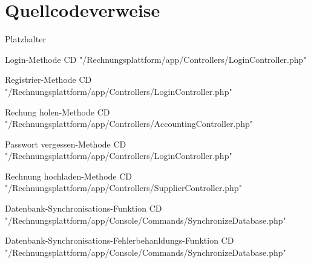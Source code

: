 %
%


\nocite{*} %





\listoffigures



\listoftables

\renewcommand\lstlistlistingname{Quellcodeverzeichnis} 
\lstlistoflistings 

\chapter{Quellcodeverweise}
\begin{bfscript}{Platzhalter}

\item [Login-Methode\label{logincode}] CD "/Rechnungsplattform/app/Controllers/LoginController.php"

\item [Registrier-Methode \label{regiscode}] CD "/Rechnungsplattform/app/Controllers/LoginController.php"

\item [Rechung holen-Methode \label{holencode}] CD "/Rechnungsplattform/app/Controllers/AccountingController.php"

\item [Passwort vergessen-Methode \label{vergessencode}] CD "/Rechnungsplattform/app/Controllers/LoginController.php"

\item [Rechnung hochladen-Methode \label{hochladencode}] CD "/Rechnungsplattform/app/Controllers/SupplierController.php"

\item [Datenbank-Synchronisations-Funktion \label{datenbanksynchronisationcode}] CD "/Rechnungsplattform/app/Console/Commands/SynchronizeDatabase.php"

\item [Datenbank-Synchronisations-Fehlerbehanldungs-Funktion \label{datenbanksynchronisationfehlerbehandlungcode}] CD "/Rechnungsplattform/app/Console/Commands/SynchronizeDatabase.php"

\end{bfscript}

